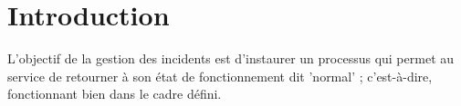 \section{Introduction}

L'objectif de la gestion des incidents est d'instaurer un processus qui
permet au service de retourner à son état de fonctionnement dit
'normal' ; c'est-à-dire, fonctionnant bien dans le cadre défini.
